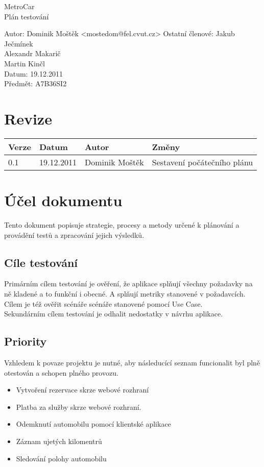 \documentclass[a4paper,titlepage]{article}
\begin{document}
	\begin{center}
		\Large{MetroCar\\Plán testování}
	\end{center}
	\vspace*{1cm}
	Autor: \hspace*{1.85cm} Dominik Moštěk <mostedom@fel.cvut.cz>
	\newline
\noindent	Ostatní členové: \indent Jakub Ječmínek\\
\hspace*{2.82cm} Alexandr Makarič\\
\hspace*{2.83cm} Martin Kinčl\\
\newline
Datum: 19.12.2011\\
Předmět: A7B36SI2 
\section*{Revize}
\begin{center}
  \begin{tabular*}{\textwidth}{| p{24pt} | p{40pt} | p{100pt} | p{271pt} | }
    \hline
    \textbf{Verze} & \textbf{Datum} & \textbf{Autor} & \textbf{Změny} \\ \hline
    0.1 & 19.12.2011 & Dominik Moštěk & Sestavení počátečního plánu \\ \hline
  \end{tabular*}
\end{center}
\section{Účel dokumentu}
Tento dokument popisuje strategie, procesy a metody určené k plánování a provádění testů a zpracování jejich výsledků.
\subsection{Cíle testování}
Primárním cílem testování je ověření, že aplikace splňují všechny požadavky na ně kladené a to funkční i obecné. A splňují metriky stanovené v požadavcích. Cílem je též ověřit scénáře scénáře stanovené pomocí Use Case.\\
Sekundárním cílem testování je odhalit nedostatky v návrhu aplikace.
\subsection{Priority}
Vzhledem k povaze projektu je nutné, aby následucící seznam funcionalit byl plně otestován a schopen plného provozu.
	\begin{itemize}
		\item Vytvoření rezervace skrze webové rozhraní
		\item Platba za služby skrze webové rozhraní.
		\item Odemknutí automobilu pomocí klientské aplikace
		\item Záznam ujetých kilomentrů
		\item Sledování polohy automobilu
	\end{itemize}
\end{document}
